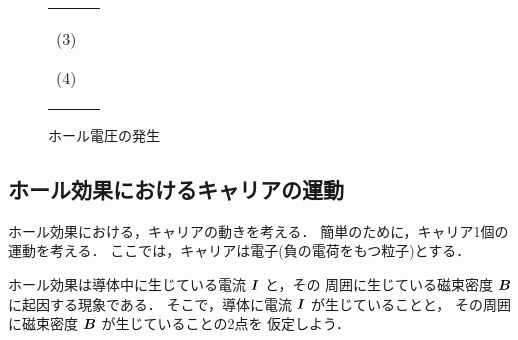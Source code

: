                     \begin{figure}[htbp]
                        \begin{tabular}{cc}
                            \begin{minipage}{0.5\hsize}
                                  \begin{center}
                                      {HallEfect4.pdf}

                                      (3)
                                  \end{center}
                            \end{minipage}
                            \begin{minipage}{0.5\hsize}
                                \begin{center}
                                    {HallEfect5.pdf}

                                      (4)
                                \end{center}
                            \end{minipage}
                        \end{tabular}
                        \caption{ホール電圧の発生}
                        \label{fig:HallEfec_Mech} %
                    \end{figure}

        \subsection{ホール効果におけるキャリアの運動}
             ホール効果における，キャリアの動きを考える．
             簡単のために，キャリア1個の運動を考える．
             ここでは，キャリアは電子(負の電荷をもつ粒子)とする．

             ホール効果は導体中に生じている電流 $\boldsymbol{I}$ と，その
             周囲に生じている磁束密度 $\boldsymbol{B}$ に起因する現象である．
             そこで，導体に電流 $\boldsymbol{I}$ が生じていることと，
             その周囲に磁束密度 $\boldsymbol{B}$ が生じていることの2点を
             仮定しよう．

